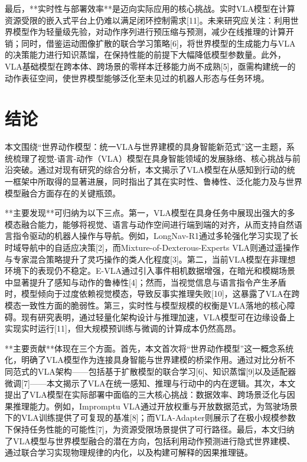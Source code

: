 \documentclass{article}
\begin{document}
最后，**实时性与部署效率**是迈向实际应用的核心挑战。实时VLA模型在计算资源受限的嵌入式平台上仍难以满足闭环控制需求[11]。未来研究应关注：利用世界模型作为轻量级先验，对动作序列进行预压缩与预测，减少在线推理的计算开销；同时，借鉴运动图像扩散的联合学习策略[6]，将世界模型的生成能力与VLA的决策能力进行知识蒸馏，在保持性能的前提下大幅降低模型参数量。此外，VLA基础模型在跨本体、跨场景的零样本迁移能力尚不成熟[5]，亟需构建统一的动作表征空间，使世界模型能够泛化至未见过的机器人形态与任务环境。

\section{结论}

本文围绕“世界动作模型：统一VLA与世界建模的具身智能新范式”这一主题，系统梳理了视觉-语言-动作（VLA）模型在具身智能领域的发展脉络、核心挑战与前沿突破。通过对现有研究的综合分析，本文揭示了VLA模型在从感知到行动的统一框架中所取得的显著进展，同时指出了其在实时性、鲁棒性、泛化能力及与世界模型融合方面存在的关键瓶颈。

**主要发现**可归纳为以下三点。第一，VLA模型在具身任务中展现出强大的多模态融合能力，能够将视觉、语言与动作空间进行端到端的对齐，从而支持自然语言指令驱动的机器人操作与导航。例如，LongNav-R1通过多轮强化学习实现了长时域导航中的自适应决策[2]，而Mixture-of-Dexterous-Experts VLA则通过遥操作与专家混合策略提升了灵巧操作的类人化程度[3]。第二，当前VLA模型在非理想环境下的表现仍不稳定。E-VLA通过引入事件相机数据增强，在暗光和模糊场景中显著提升了感知与动作的鲁棒性[4]；然而，当视觉信息与语言指令产生矛盾时，模型倾向于过度依赖视觉模态，导致反事实推理失败[10]，这暴露了VLA在跨模态一致性方面的脆弱性。第三，实时性与模型规模的权衡是VLA落地的核心障碍。现有研究表明，通过轻量化架构设计与推理加速，VLA模型可在边缘设备上实现实时运行[11]，但大规模预训练与微调的计算成本仍然高昂。

**主要贡献**体现在三个方面。首先，本文首次将“世界动作模型”这一概念系统化，明确了VLA模型作为连接具身智能与世界建模的桥梁作用。通过对比分析不同范式的VLA架构——包括基于扩散模型的联合学习[6]、知识蒸馏[9]以及适配器微调[7]——本文揭示了VLA在统一感知、推理与行动中的内在逻辑。其次，本文提出了VLA模型在实际部署中面临的三大核心挑战：数据效率、跨场景泛化与因果推理能力。例如，Impromptu VLA通过开放权重与开放数据范式，为驾驶场景下的VLA训练提供了可复现的基准[8]；而VLA-Adapter则展示了在极小规模参数下保持任务性能的可能性[7]，为资源受限场景提供了可行路径。最后，本文归纳了VLA模型与世界模型融合的潜在方向，包括利用动作预测进行隐式世界建模、通过联合学习实现物理规律的内化，以及构建可解释的因果推理链。
\end{document}
